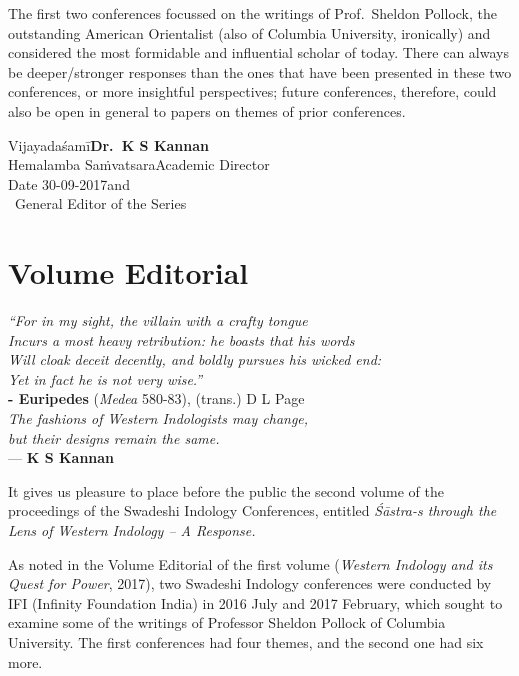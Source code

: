 The first two conferences focussed on the writings of Prof.\ Sheldon Pollock, the outstanding American Orientalist (also of Columbia University, ironically) and considered the most formidable and influential scholar of today. There can always be deeper/stronger responses than the ones that have been presented in these two conferences, or more insightful perspectives; future conferences, therefore, could also be open in general to papers on themes of prior conferences.
\bigskip

\noindent
Vijayadaśamī\hfill	{\bf Dr.~K S Kannan}\\
Hemalamba Saṁvatsara\hfill Academic Director\\
Date 30-09-2017\hfill and\\	
\phantom{.}~\hfill General Editor of the Series                  
               

\chapter*{Volume Editorial}\label{editorial}

\vskip 9pt

\begin{flushright}
{{\sl “For in my sight, the villain with a crafty tongue}}\\
{\sl Incurs a most heavy retribution: he boasts that his words}\\
{\sl Will cloak deceit decently, and boldly pursues his wicked end:}\\
{\sl Yet in fact he is not very wise.”}\\
{\bf - Euripedes} ({\sl Medea} 580-83), (trans.) D L Page\\[5pt]
{\sl The fashions of Western Indologists may change,\\ 
but their designs remain the same.}\\[3pt]
--- {\bf K S Kannan}
\end{flushright}

It gives us pleasure to place before the public the second volume of the proceedings of the Swadeshi Indology Conferences, entitled    
{\sl Śāstra-s through the Lens of Western Indology -- A Response.}

As noted in the Volume Editorial of the first volume ({\sl Western Indology and its Quest for Power}, 2017), two Swadeshi Indology conferences were conducted by IFI (Infinity Foundation India) in 2016 July and 2017 February, which sought to examine some of the writings of Professor Sheldon Pollock of Columbia University. The first conferences had four themes, and the second one had six more. 

